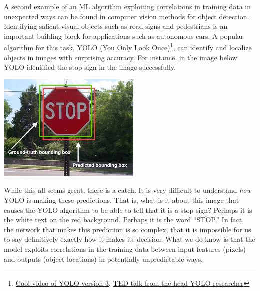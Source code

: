 \documentclass[assignment01_Solutions]{subfiles}
\begin{document}
A second example of an ML algorithm exploiting correlations in training data in unexpected ways can be found in computer vision methods for object detection.  Identifying salient visual objects such as road signs and pedestrians is an important building block for applications such as autonomous cars.  A popular algorithm for this task, \href{https://pjreddie.com/darknet/yolo/}{YOLO} (You Only Look Once)\footnote{\href{https://www.youtube.com/watch?time_continue=77&v=MPU2HistivI}{Cool video of YOLO version 3}, \href{https://www.youtube.com/watch?v=Cgxsv1riJhI}{TED talk from the head YOLO researcher}}, can identify and localize objects in images with surprising accuracy.  For instance, in the image below YOLO identified the stop sign in the image successfully.
\begin{center}
\includegraphics[width=0.6\linewidth]{figures/stopsignyolo}
\end{center}

While this all seems great, there is a catch.  It is very difficult to understand \emph{how} YOLO is making these predictions.  That is, what is it about this image that causes the YOLO algorithm to be able to tell that it is a stop sign?  Perhaps it is the white text on the red background.  Perhaps it is the word ``STOP.''  In fact, the network that makes this prediction is so complex, that it is impossible for us to say definitively exactly how it makes its decision.  What we do know is that the model exploits correlations in the training data between input features (pixels) and outputs (object locations) in potentially unpredictable ways.
\end{document}
